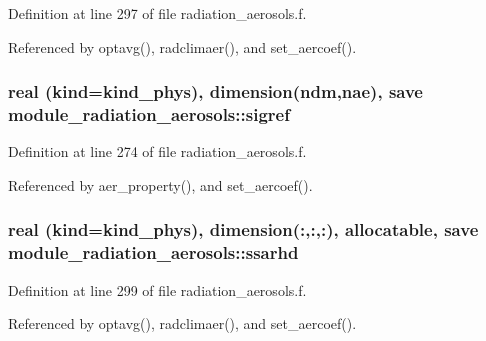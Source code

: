 Definition at line 297 of file radiation\+\_\+aerosols.\+f.



Referenced by optavg(), radclimaer(), and set\+\_\+aercoef().

\subsubsection[{\texorpdfstring{sigref}{sigref}}]{\setlength{\rightskip}{0pt plus 5cm}real (kind=kind\+\_\+phys), dimension({\bf ndm},{\bf nae}), save module\+\_\+radiation\+\_\+aerosols\+::sigref\hspace{0.3cm}{\ttfamily [private]}}\hypertarget{namespacemodule__radiation__aerosols_a227ac7558dc0f33c34c34544771617ec}{}\label{namespacemodule__radiation__aerosols_a227ac7558dc0f33c34c34544771617ec}


Definition at line 274 of file radiation\+\_\+aerosols.\+f.



Referenced by aer\+\_\+property(), and set\+\_\+aercoef().

\subsubsection[{\texorpdfstring{ssarhd}{ssarhd}}]{\setlength{\rightskip}{0pt plus 5cm}real (kind=kind\+\_\+phys), dimension(\+:,\+:,\+:), allocatable, save module\+\_\+radiation\+\_\+aerosols\+::ssarhd\hspace{0.3cm}{\ttfamily [private]}}\hypertarget{namespacemodule__radiation__aerosols_ac0714d386ee3dc2ca7f6692905566274}{}\label{namespacemodule__radiation__aerosols_ac0714d386ee3dc2ca7f6692905566274}


Definition at line 299 of file radiation\+\_\+aerosols.\+f.



Referenced by optavg(), radclimaer(), and set\+\_\+aercoef().

